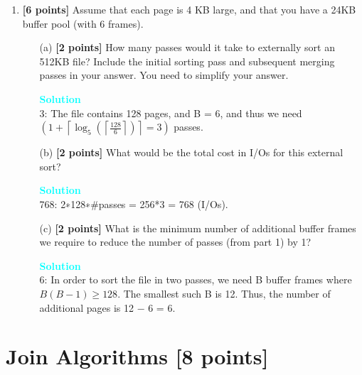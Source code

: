\documentclass[10pt]{article}
\newenvironment{solution}
    { \begin{mdframed}[backgroundcolor=gray!10] \textcolor{cyan}{\textbf{Solution}} \\}
    {  \end{mdframed}}
\begin{document}
\begin{enumerate}
	\item \textbf{[6 points]}
	      Assume that each page is 4 KB large, and that you have a 24KB buffer pool (with 6 frames).
	      \begin{itemize}
		      \item[(a)] \textbf{[2 points]} How many passes would it take to externally sort an 512KB file?
		            Include the initial sorting pass and subsequent merging passes in your answer. You need to simplify your answer.
		            \begin{solution}
			            3: The file contains 128 pages, and B = 6, and thus we need
			            $\left(1+\left\lceil\log _{5}\left(\left\lceil\frac{128}{6}\right\rceil\right)\right\rceil=3\right)$ passes.
		            \end{solution}
		      \item[(b)] \textbf{[2 points]} What would be the total cost in I/Os for this external sort?
		            \begin{solution}
			            768: 2∗128∗$\#$passes = 256*3 = 768 (I/Os).
		            \end{solution}
		      \item[(c)] \textbf{[2 points]} What is the minimum number of additional buffer frames we require to reduce the number of passes
		            (from part 1) by 1?
		            \begin{solution}
			            6: In order to sort the file in two passes, we need B buffer frames
			            where $B(B - 1) \geq 128$. The smallest such B is 12.
			            Thus, the number of additional pages is 12 − 6 = 6.
		            \end{solution}
	      \end{itemize}
\end{enumerate}


\newpage
\section{Join Algorithms \textbf{[8 points]}}
\end{document}
